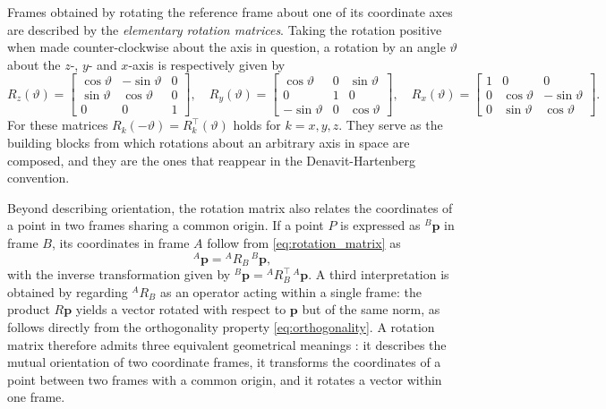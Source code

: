 Frames obtained by rotating the reference frame about one of its coordinate axes
are described by the \textit{elementary rotation matrices}. Taking the rotation
positive when made counter-clockwise about the axis in question, a rotation by an
angle $\vartheta$ about the $z$-, $y$- and $x$-axis is respectively given by
\begin{equation}
    R_z(\vartheta) = \begin{bmatrix}
        \cos\vartheta & -\sin\vartheta & 0 \\
        \sin\vartheta & \cos\vartheta & 0 \\
        0 & 0 & 1
    \end{bmatrix}, \quad
    R_y(\vartheta) = \begin{bmatrix}
        \cos\vartheta & 0 & \sin\vartheta \\
        0 & 1 & 0 \\
        -\sin\vartheta & 0 & \cos\vartheta
    \end{bmatrix}, \quad
    R_x(\vartheta) = \begin{bmatrix}
        1 & 0 & 0 \\
        0 & \cos\vartheta & -\sin\vartheta \\
        0 & \sin\vartheta & \cos\vartheta
    \end{bmatrix}.
    \label{eq:elementary_rotations}
\end{equation}
For these matrices $R_k(-\vartheta) = R_k^\top(\vartheta)$ holds for
$k = x, y, z$. They serve as the building blocks from which rotations about an
arbitrary axis in space are composed, and they are the ones that reappear in the
Denavit-Hartenberg convention.

Beyond describing orientation, the rotation matrix also relates the coordinates
of a point in two frames sharing a common origin. If a point $P$ is expressed as
$^B\mathbf{p}$ in frame $B$, its coordinates in frame $A$ follow from
\eqref{eq:rotation_matrix} as
\begin{equation}
    ^A\mathbf{p} = {}^A R_B \, ^B\mathbf{p},
    \label{eq:coordinate_transform}
\end{equation}
with the inverse transformation given by
$^B\mathbf{p} = {}^A R_B^\top \, ^A\mathbf{p}$. A third interpretation is obtained
by regarding $^A R_B$ as an operator acting within a single frame: the product
$R\mathbf{p}$ yields a vector rotated with respect to $\mathbf{p}$ but of the same
norm, as follows directly from the orthogonality property
\eqref{eq:orthogonality}. A rotation matrix therefore admits three equivalent
geometrical meanings \cite{siciliano2009robotics}: it describes the mutual
orientation of two coordinate frames, it transforms the coordinates of a point
between two frames with a common origin, and it rotates a vector within one frame.


